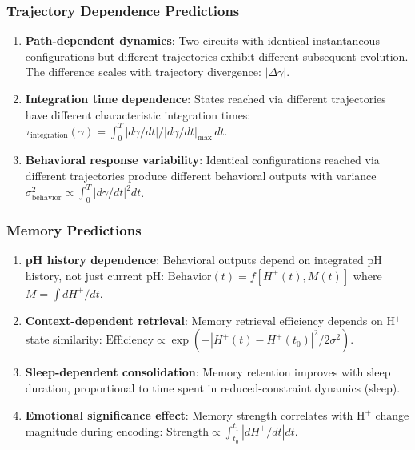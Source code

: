 \documentclass[aps,prd,twocolumn,superscriptaddress,floatfix,nofootinbib]{revtex4-2}
\theoremstyle{remark}
\begin{document}
\subsubsection{Trajectory Dependence Predictions}

\begin{enumerate}
\item \textbf{Path-dependent dynamics}: Two circuits with identical instantaneous configurations but different trajectories exhibit different subsequent evolution. The difference scales with trajectory divergence: $|\Delta \gamma|$.

\item \textbf{Integration time dependence}: States reached via different trajectories have different characteristic integration times: $\tau_{\text{integration}}(\gamma) = \int_0^T |d\gamma/dt| / |d\gamma/dt|_{\text{max}} \, dt$.

\item \textbf{Behavioral response variability}: Identical configurations reached via different trajectories produce different behavioral outputs with variance $\sigma^2_{\text{behavior}} \propto \int_0^T |d\gamma/dt|^2 dt$.
\end{enumerate}

\subsubsection{Memory Predictions}

\begin{enumerate}
\item \textbf{pH history dependence}: Behavioral outputs depend on integrated pH history, not just current pH: $\text{Behavior}(t) = f[H^+(t), M(t)]$ where $M = \int dH^+/dt$.

\item \textbf{Context-dependent retrieval}: Memory retrieval efficiency depends on H$^+$ state similarity: $\text{Efficiency} \propto \exp(-|H^+(t) - H^+(t_0)|^2 / 2\sigma^2)$.

\item \textbf{Sleep-dependent consolidation}: Memory retention improves with sleep duration, proportional to time spent in reduced-constraint dynamics (sleep).

\item \textbf{Emotional significance effect}: Memory strength correlates with H$^+$ change magnitude during encoding: $\text{Strength} \propto \int_{t_0}^{t_1} |dH^+/dt| dt$.
\end{enumerate}
\end{document}
